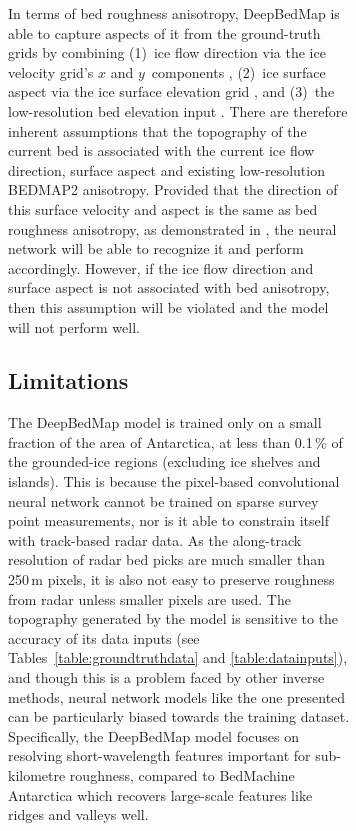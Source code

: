 \documentclass[tc, noline]{copernicus}
\begin{document}
\begin{figure}[t]
\begin{figure}[t]
In terms of bed roughness anisotropy, DeepBedMap is able to capture aspects of it from the ground-truth grids by combining (1)~ice flow direction via the ice velocity grid's $x$ and $y$~components \citep{MouginotMEaSUREsPhaseMap2019}, (2)~ice surface aspect via the ice surface elevation grid \citep{HowatReferenceElevationModel2019}, and (3)~the low-resolution bed elevation input \citep{FretwellBedmap2improvedice2013}.
There are therefore inherent assumptions that the topography of the current bed is associated with the current ice flow direction, surface aspect and existing low-resolution BEDMAP2 anisotropy.
Provided that the direction of this surface velocity and aspect is the same as bed roughness anisotropy, as demonstrated in \citet{HolschuhLinkingpostglaciallandscapes2020}, the neural network will be able to recognize it and perform accordingly.
However, if the ice flow direction and surface aspect is not associated with bed anisotropy, then this assumption will be violated and the model will not perform well.

\subsection{Limitations}

The DeepBedMap model is trained only on a small fraction of the area of Antarctica, at less than 0.1\,{\%} of the grounded-ice regions (excluding ice shelves and islands).
This is because the pixel-based convolutional neural network cannot be trained on sparse survey point measurements, nor is it able to constrain itself with track-based radar data.
As the along-track resolution of radar bed picks are much smaller than 250\,\unit{m} pixels, it is also not easy to preserve roughness from radar unless smaller pixels are used.
The topography generated by the model is sensitive to the accuracy of its data inputs (see Tables~\ref{table:groundtruthdata} and \ref{table:datainputs}), and though this is a problem faced by other inverse methods, neural network models like the one presented can be particularly biased towards the training dataset.
Specifically, the DeepBedMap model focuses on resolving short-wavelength features important for sub-kilometre roughness, compared to BedMachine Antarctica \citep{MorlighemDeepglacialtroughs2019} which recovers large-scale features like ridges and valleys well.


\end{figure}
\end{figure}
\end{document}
